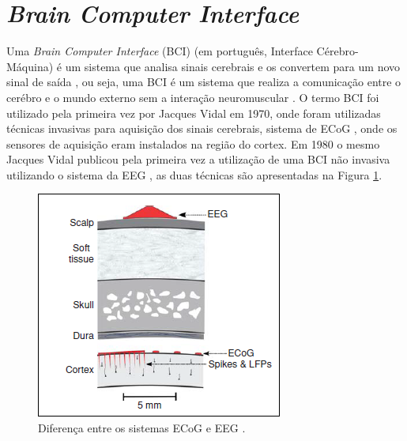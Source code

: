 \section{\textit{Brain Computer Interface}}

Uma \textit{Brain Computer Interface} (BCI) (em português, Interface Cérebro-Máquina) é um sistema que analisa sinais cerebrais e os convertem para um novo sinal de saída \cite{BCIWolpaw}, ou seja, uma BCI é um sistema que realiza a comunicação entre o cerébro e o mundo externo sem a interação neuromuscular \cite{BCIWolpaw}.
O termo BCI foi utilizado pela primeira vez por Jacques Vidal em 1970, onde foram utilizadas técnicas invasivas para aquisição dos sinais cerebrais, sistema de ECoG \cite{BCIWolpaw}, onde os sensores de aquisição eram instalados na região do cortex. Em 1980 o mesmo Jacques Vidal publicou pela primeira vez a utilização de uma BCI não invasiva utilizando o sistema da EEG \cite{CristophBCI}, as duas técnicas são apresentadas na Figura \ref{ECoGeEEG}.

\begin{figure}[h]
	\centering
	\includegraphics[keepaspectratio=true,scale=1.0]{figuras/sistemas_de_aquisicao.PNG}
	\caption{Diferença entre os sistemas ECoG e EEG \cite{BCIWolpaw}.}
	\label{ECoGeEEG}
\end{figure}

